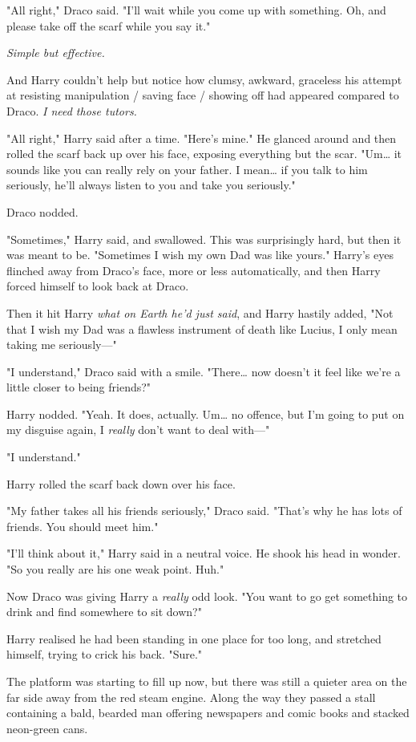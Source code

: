 "All right," Draco said. "I'll wait while you come up with something. Oh, and 
please take off the scarf while you say it."

\emph{Simple but effective.}

And Harry couldn't help but notice how clumsy, awkward, graceless his attempt 
at resisting manipulation / saving face / showing off had appeared compared to 
Draco. \emph{I need those tutors.}

"All right," Harry said after a time. "Here's mine." He glanced around and then 
rolled the scarf back up over his face, exposing everything but the scar. 
"Um{\ldots} it sounds like you can really rely on your father. I mean{\ldots} 
if you talk to him seriously, he'll always listen to you and take you 
seriously."

Draco nodded.

"Sometimes," Harry said, and swallowed. This was surprisingly hard, but then it 
was meant to be. "Sometimes I wish my own Dad was like yours." Harry's eyes 
flinched away from Draco's face, more or less automatically, and then Harry 
forced himself to look back at Draco.

Then it hit Harry \emph{what on Earth he'd just said}, and Harry hastily added, 
"Not that I wish my Dad was a flawless instrument of death like Lucius, I only 
mean taking me seriously---"

"I understand," Draco said with a smile. "There{\ldots} now doesn't it feel 
like we're a little closer to being friends?"

Harry nodded. "Yeah. It does, actually. Um{\ldots} no offence, but I'm going to 
put on my disguise again, I \emph{really} don't want to deal with---"

"I understand."

Harry rolled the scarf back down over his face.

"My father takes all his friends seriously," Draco said. "That's why he has 
lots of friends. You should meet him."

"I'll think about it," Harry said in a neutral voice. He shook his head in 
wonder. "So you really are his one weak point. Huh."

Now Draco was giving Harry a \emph{really} odd look. "You want to go get 
something to drink and find somewhere to sit down?"

Harry realised he had been standing in one place for too long, and stretched 
himself, trying to crick his back. "Sure."

The platform was starting to fill up now, but there was still a quieter area on 
the far side away from the red steam engine. Along the way they passed a stall 
containing a bald, bearded man offering newspapers and comic books and stacked 
neon-green cans.

